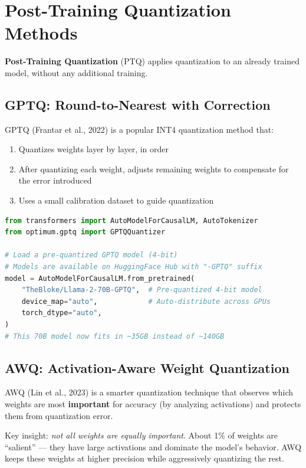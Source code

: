 \documentclass[11pt, twoside, openright]{book}
\newcommand{\keyterm}[1]{\textbf{\color{AccentOrange}#1}}
\begin{document}
\section{Post-Training Quantization Methods}

\keyterm{Post-Training Quantization} (PTQ) applies quantization to an already
trained model, without any additional training.

\subsection{GPTQ: Round-to-Nearest with Correction}

GPTQ (Frantar et al., 2022) is a popular INT4 quantization method that:
\begin{enumerate}
  \item Quantizes weights layer by layer, in order
  \item After quantizing each weight, adjusts remaining weights to compensate
        for the error introduced
  \item Uses a small calibration dataset to guide quantization
\end{enumerate}

\begin{lstlisting}[language=Python, caption={Loading a GPTQ quantized model}]
from transformers import AutoModelForCausalLM, AutoTokenizer
from optimum.gptq import GPTQQuantizer

# Load a pre-quantized GPTQ model (4-bit)
# Models are available on HuggingFace Hub with "-GPTQ" suffix
model = AutoModelForCausalLM.from_pretrained(
    "TheBloke/Llama-2-70B-GPTQ",  # Pre-quantized 4-bit model
    device_map="auto",            # Auto-distribute across GPUs
    torch_dtype="auto",
)
# This 70B model now fits in ~35GB instead of ~140GB
\end{lstlisting}

\subsection{AWQ: Activation-Aware Weight Quantization}

AWQ (Lin et al., 2023) is a smarter quantization technique that observes which
weights are most \textbf{important} for accuracy (by analyzing activations) and
protects them from quantization error.

Key insight: \textit{not all weights are equally important}.  About 1\% of
weights are ``salient'' --- they have large activations and dominate the model's
behavior.  AWQ keeps these weights at higher precision while aggressively
quantizing the rest.
\end{document}
